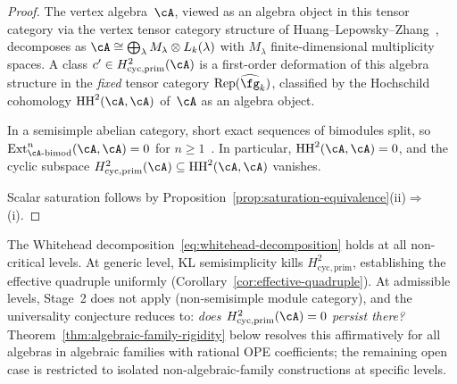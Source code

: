 \begin{proof}
The vertex algebra~$\cA$, viewed as an algebra object in
this tensor category via the vertex tensor category
structure of Huang--Lepowsky--Zhang~\cite{HLZ}, decomposes as
$\cA \cong \bigoplus_\lambda M_\lambda \otimes L_k(\lambda)$
with $M_\lambda$ finite-dimensional multiplicity spaces.
A class $c' \in H^2_{\mathrm{cyc,prim}}(\cA)$ is a
first-order deformation of this algebra structure in the
\emph{fixed} tensor category
$\mathrm{Rep}(\widehat{\fg}_k)$, classified by the
Hochschild cohomology $\mathrm{HH}^2(\cA, \cA)$ of~$\cA$
as an algebra object.

In a semisimple abelian category, short exact sequences
of bimodules split, so
$\mathrm{Ext}^n_{{\cA}\text{-bimod}}({\cA}, {\cA}) = 0$ for
$n \geq 1$~\cite{EGNO}.
In particular,
$\mathrm{HH}^2(\cA, \cA) = 0$, and
the cyclic subspace
$H^2_{\mathrm{cyc,prim}}(\cA)
\subseteq \mathrm{HH}^2(\cA, \cA)$
vanishes.

Scalar saturation follows by
Proposition~\ref{prop:saturation-equivalence}(ii)$\Rightarrow$(i).
\end{proof}

\begin{remark}
\label{rem:cyclic-rigidity-scope}
The Whitehead decomposition~\eqref{eq:whitehead-decomposition} holds
at all non-critical levels.  At generic level, KL semisimplicity kills
$H^2_{\mathrm{cyc,prim}}$, establishing the effective quadruple
uniformly (Corollary~\ref{cor:effective-quadruple}).
At admissible levels, Stage~2 does not apply (non-semisimple module
category), and the universality conjecture reduces to:
\emph{does $H^2_{\mathrm{cyc,prim}}(\cA)=0$ persist there?}
Theorem~\ref{thm:algebraic-family-rigidity} below resolves this
affirmatively for all algebras in algebraic families with
rational OPE coefficients; the remaining open case is restricted to
isolated non-algebraic-family constructions at specific levels.
\end{remark}


